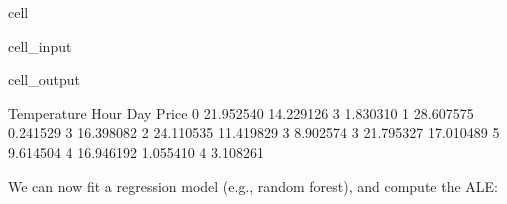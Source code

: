 \documentclass[letterpaper,10pt,english]{jupyterBook}
\begin{document}
\begin{sphinxuseclass}{cell}
\begin{sphinxVerbatimInput}
\begin{sphinxuseclass}{cell_input}
\begin{sphinxVerbatim}[commandchars=\\\{\}]
  
     
     
     
     

\end{sphinxVerbatim}

\end{sphinxuseclass}\end{sphinxVerbatimInput}
\begin{sphinxVerbatimOutput}

\begin{sphinxuseclass}{cell_output}
\begin{sphinxVerbatim}[commandchars=\\\{\}]
   Temperature       Hour  Day      Price
0    21.952540  14.229126    3   1.830310
1    28.607575   0.241529    3  16.398082
2    24.110535  11.419829    3   8.902574
3    21.795327  17.010489    5   9.614504
4    16.946192   1.055410    4   3.108261
\end{sphinxVerbatim}

\end{sphinxuseclass}\end{sphinxVerbatimOutput}

\end{sphinxuseclass}
\sphinxAtStartPar
We can now fit a regression model (e.g., random forest), and compute the ALE:
\end{document}
